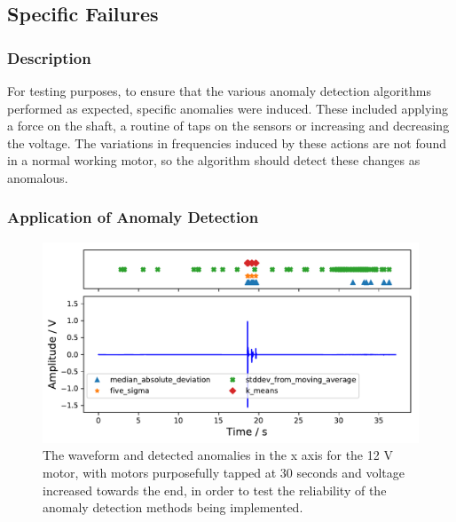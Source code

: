 \subsection{Specific Failures}

\subsubsection{Description}

For testing purposes, to ensure that the various anomaly detection algorithms performed as expected, specific anomalies were induced. These included applying a force on the shaft, a routine of taps on the sensors or increasing and decreasing the voltage. The variations in frequencies induced by these actions are not found in a normal working motor, so the algorithm should detect these changes as anomalous. 

\subsubsection{Application of Anomaly Detection}

\begin{figure}[t]
    \includegraphics[width=1.0\textwidth]{fig/specific_anomaly_test1_motornorm12V.pdf}
    \caption[Specific Anomaly Test]{The waveform and detected anomalies in the x axis for the 12 V motor, with motors purposefully tapped at 30 seconds and voltage increased towards the end, in order to test the reliability of the anomaly detection methods being implemented.}
    \label{fig:spec_anom1}
\end{figure}


